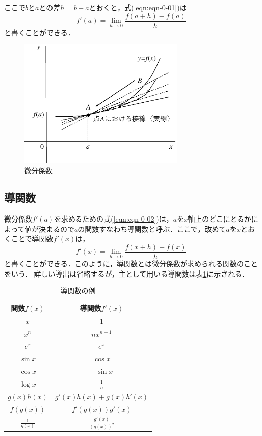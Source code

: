 ここで$b$と$a$との差$h=b-a$とおくと，式(\ref{eqn:eqn-0-01})は
\begin{equation}
f'(a)=\lim_{h \rightarrow 0}\frac{f(a+h)-f(a)}{h}
\label{eqn:eqn-0-02}
\end{equation}
と書くことができる．

\begin{figure}[H]
\begin{center}
\includegraphics[width=80mm]{fig/zu-0-02.eps}
\end{center}
\caption{微分係数}
\label{fig:zu-0-02}
\end{figure}

\subsection{導関数}
\label{subsection:doukansu}

微分係数$f'(a)$を求めるための式(\ref{eqn:eqn-0-02})は，$a$を$x$軸上のどこにとるかによって値が決まるので$a$の関数すなわち導関数と呼ぶ．ここで，改めて$a$を$x$とおくことで導関数$f'(x)$は，
\begin{equation}
f'(x)=\lim_{h \rightarrow 0}\frac{f(x+h)-f(x)}{h}
\label{eqn:eqn-0-03}
\end{equation}
と書くことができる．このように，導関数とは微分係数が求められる関数のことをいう．
詳しい導出は省略するが，主として用いる導関数は表\ref{table:table0-1}に示される．

\begin{table}[H]
\caption{導関数の例}
\label{table:table0-1}
\begin{center}
\begin{tabular}{c|c}
\hline
関数$f(x)$ & 導関数$f'(x)$ \\
\hline
$x$ & 1 \\
\hline
$x^n$ & $nx^{n-1}$ \\
\hline
$e^x$ & $e^x$ \\
\hline
$\sin x$ & $\cos x$ \\
\hline
$\cos x$ & $-\sin x$ \\
\hline
$\log x$ & $\displaystyle \frac{1}{n}$ \\
\hline
$g(x)h(x)$ & $g'(x)h(x)+g(x)h'(x)$ \\
\hline
$f(g(x))$ & $f'(g(x))g'(x)$ \\
\hline
$\displaystyle \frac{1}{g(x)}$ & $\displaystyle \frac{g'(x)}{(g(x))^2}$ \\
\hline
\end{tabular}
\end{center}
\end{table}

